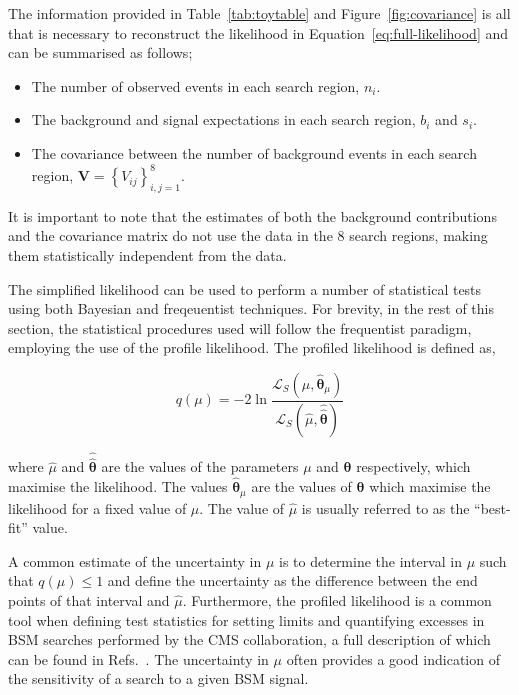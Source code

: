 The information provided in Table~\ref{tab:toytable} and Figure~\ref{fig:covariance} is all that is necessary to reconstruct the likelihood in Equation~\ref{eq:full-likelihood} and 
can be summarised as follows; 

\begin{itemize}
\item {The number of observed events in each search region, $n_{i}$.}
\item {The background and signal expectations in each search region, $b_{i}$ and $s_{i}$.}
\item {The covariance between the number of background events in each search region, $\mathrm{\mathbf{V}}=\left\{V_{ij}\right\}_{i,j=1}^{8}$. }
\end{itemize}

It is important to note that the estimates of both the background contributions and the 
covariance matrix do not use the data in the 8 search regions, making them statistically independent from the data. 

The simplified likelihood can be used to perform a number of statistical tests using both Bayesian and freqeuentist techniques. For brevity, in the rest of this section, 
the statistical procedures used will follow the frequentist paradigm, employing the use of the profile likelihood. The profiled likelihood is defined as, 

\begin{equation}
q(\mu) = -2\ln \dfrac {\mathcal{L}_{S}(\mu,\hat{\boldsymbol{\theta}}_{\mu})} {\mathcal{L}_{S}(\hat{\mu},\hat{\hat{\boldsymbol{\theta}}})}
\label{eq:llr}
\end{equation}

where $\hat{\mu}$ and $\hat{\hat{\boldsymbol{\theta}}}$ are the values of the parameters $\mu$ and $\boldsymbol{\theta}$ respectively, 
which maximise the likelihood. The values $\hat{\boldsymbol{\theta}}_{\mu}$ are the values of $\boldsymbol{\theta}$ which maximise the 
likelihood for a fixed value of $\mu$. The value of $\hat{\mu}$ is usually referred to as the ``best-fit'' value.

A common estimate of the uncertainty in $\mu$ is to determine the interval in $\mu$ such that $q(\mu)\leq1$ and define the uncertainty as the difference between 
the end points of that interval and $\hat{\mu}$. Furthermore, the profiled likelihood is a common tool when defining test statistics for setting limits and quantifying excesses 
in BSM searches performed by the CMS collaboration, a full description of which can be found in Refs.~\cite{Chatrchyan:2012tx}. The 
uncertainty in $\mu$ often provides a good indication of the sensitivity of a search to a given BSM signal. 

